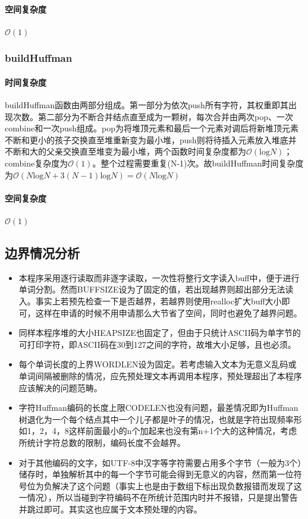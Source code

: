\documentclass{homework}
\begin{document}
    \paragraph{空间复杂度}$\mathcal{O}(1)$
    \subsubsection{buildHuffman}
    \paragraph{时间复杂度}buildHuffman函数由两部分组成。第一部分为依次push所有字符，其权重即其出现次数。第二部分为不断合并结点直至成为一颗树，每次合并由两次pop、一次combine和一次push组成。pop为将堆顶元素和最后一个元素对调后将新堆顶元素不断和更小的孩子交换直至堆重新变为最小堆，push则将待插入元素放入堆底并不断和大的父亲交换直至堆变为最小堆，两个函数时间复杂度都为$\mathcal{O}(\mathrm{log}N)$；combine复杂度为$\mathcal{O}(1)$。整个过程需要重复(N-1)次。故buildHuffman时间复杂度为$\mathcal{O}(N\mathrm{log}N+3(N-1)\mathrm{log}N)=\mathcal{O}(N\mathrm{log}N)$
    \paragraph{空间复杂度}$\mathcal{O}(1)$
\subsection{边界情况分析}
\begin{itemize}
    \item 本程序采用逐行读取而非逐字读取，一次性将整行文字读入buff中，便于进行单词分割。然而BUFFSIZE设为了固定的值，若出现越界则超出部分无法读入。事实上若预先检查一下是否越界，若越界则使用realloc扩大buff大小即可，这样在申请的时候不用申请那么大节省了空间，同时也避免了越界问题。
    \item 同样本程序堆的大小HEAPSIZE也固定了，但由于只统计ASCII码为单字节的可打印字符，即ASCII码在30到127之间的字符，故堆大小足够，且也必须。
    \item 每个单词长度的上界WORDLEN设为固定。若考虑输入文本为无意义乱码或单词间隔被删除的情况，应先预处理文本再调用本程序，预处理超出了本程序应该解决的问题范畴。
    \item 字符Huffman编码的长度上限CODELEN也没有问题，最差情况即为Huffman树退化为一个每个结点其中一个儿子都是叶子的情况，也就是字符出现频率形如1，2，4，8这样前面最小的n个加起来也没有第n+1个大的这种情况，考虑所统计字符总数的限制，编码长度不会越界。
    \item 对于其他编码的文字，如UTF-8中汉字等字符需要占用多个字节（一般为3个）储存时，单独解析其中的每一个字节可能会得到无意义的内容，然而第一位符号位为负解决了这个问题（事实上也是由于数组下标出现负数报错而发现了这一情况），所以当碰到字符编码不在所统计范围内时并不报错，只是提出警告并跳过即可。其实这也应属于文本预处理的内容。
\end{itemize}
\end{document}
